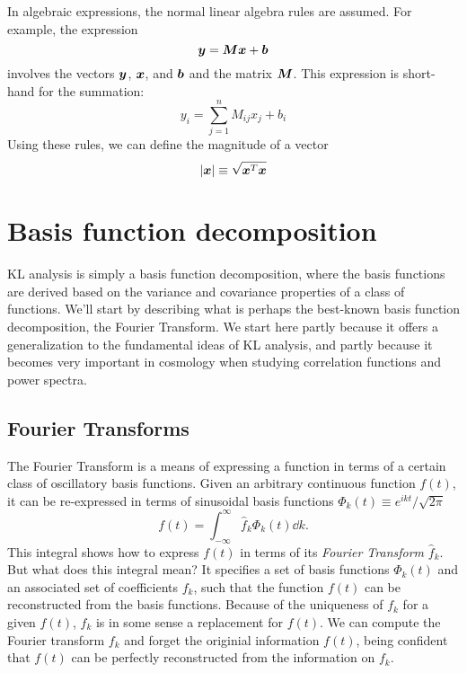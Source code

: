 In algebraic expressions, the normal linear algebra rules are assumed.
For example, the expression 
\begin{equation}
  \boldsymbol{y} = \boldsymbol{M}\boldsymbol{x} + \boldsymbol{b}
\end{equation}
involves the vectors $\boldsymbol{y}$, $\boldsymbol{x}$, and $\boldsymbol{b}$ and the
matrix $\boldsymbol{M}$.  This expression is short-hand for the summation:
\begin{equation}
  y_i = \sum_{j=1}^{n} M_{ij} x_j + b_i
\end{equation}
Using these rules, we can define the magnitude of a vector
\begin{equation}
  |\boldsymbol{x}| \equiv \sqrt{\boldsymbol{x}^T \boldsymbol{x}}
\end{equation}

\section{Basis function decomposition}
KL analysis is simply a basis function decomposition, where the basis
functions are derived based on the variance and covariance properties
of a class of functions.  We'll start by describing what is perhaps the
best-known basis function decomposition, the Fourier Transform.
We start here partly because it offers a generalization to the fundamental
ideas of KL analysis, and partly because it becomes very important in
cosmology when studying correlation functions and power spectra.

\subsection{Fourier Transforms}
The Fourier Transform is a means of expressing a function in terms
of a certain class of oscillatory basis functions.
Given an arbitrary continuous function
$f(t)$, it can be re-expressed in terms of sinusoidal basis functions
$\Phi_k(t) \equiv e^{ikt} / \sqrt{2\pi}$
\begin{equation}
  \label{eq:FT_1D}
  f(t) = \int_{-\infty}^\infty \hat{f}_k \Phi_k(t) \dd k.
\end{equation}
This integral shows how to express $f(t)$ in terms of its
{\it Fourier Transform} $\hat{f}_k$.  But what does this integral mean?
It specifies a set of basis functions $\Phi_k(t)$ and an associated set of
coefficients $f_k$, such that the function $f(t)$ can be reconstructed
from the basis functions.  Because of the uniqueness of $f_k$ for a given
$f(t)$, $f_k$ is in some sense a replacement for $f(t)$.  We can compute
the Fourier transform $f_k$ and forget the originial information $f(t)$,
being confident that $f(t)$ can be perfectly reconstructed from the
information on $f_k$.

